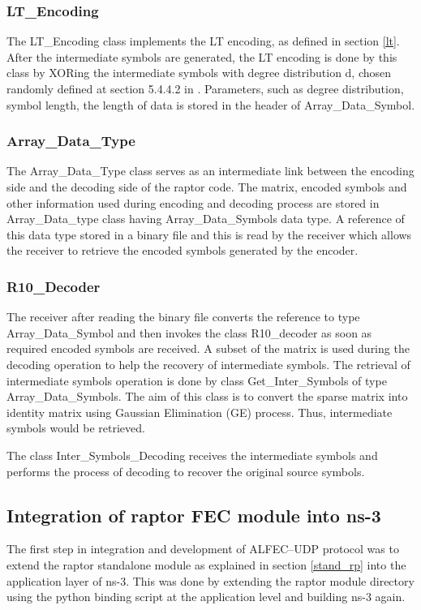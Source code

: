\subsubsection{LT\_Encoding} \label{lte}
The LT\_Encoding class implements the LT encoding, as defined in section \ref{lt}. After the intermediate symbols are generated, the LT encoding is done by this class by XORing the intermediate symbols with degree distribution d, chosen randomly defined at section 5.4.4.2 in \cite{luby2007rfc}. Parameters, such as degree distribution, symbol length, the length of data is stored in the header of Array\_Data\_Symbol.

\subsubsection{Array\_Data\_Type} \label{adt}
The Array\_Data\_Type class serves as an intermediate link between the encoding side and the decoding side of the raptor code. The matrix, encoded symbols and other information used during encoding and decoding process are stored in Array\_Data\_type class having Array\_Data\_Symbols data type. A reference of this data type stored in a binary file and this is read by the receiver which allows the receiver to retrieve the encoded symbols generated by the encoder.

\subsubsection{R10\_Decoder} \label{r10d}
The receiver after reading the binary file converts the reference to type Array\_Data\_Symbol and then invokes the class R10\_decoder as soon as required encoded symbols are received. A subset of the matrix is used during the decoding operation to help the recovery of intermediate symbols. The retrieval of intermediate symbols operation is done by class Get\_Inter\_Symbols of type Array\_Data\_Symbols. The aim of this class is to convert the sparse matrix into identity matrix using Gaussian Elimination (GE) process. Thus, intermediate symbols would be retrieved.

The class Inter\_Symbols\_Decoding receives the intermediate symbols and performs the process of decoding to recover the original source symbols.

\subsection{Integration of raptor FEC module into ns-3}
\label{ns3int}
The first step in integration and development of ALFEC--UDP protocol was to extend the raptor standalone module as explained in section \ref{stand_rp} into the application layer of ns-3. This was done by extending the raptor module directory using the python binding script at the application level and building ns-3 again.

